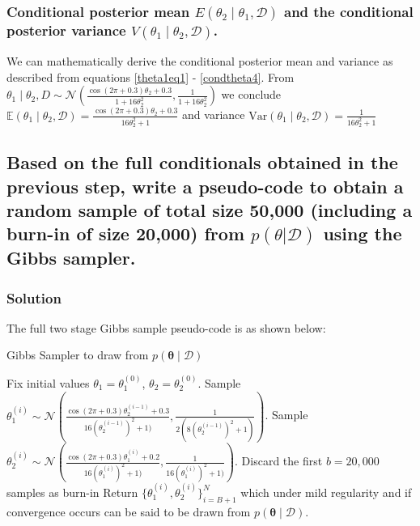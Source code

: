 \documentclass[12pt]{article}
\begin{document}
\subsubsection{Conditional posterior mean \(E(\theta_2 \mid \theta_1, \mathcal{D})\) and the conditional posterior variance \(V(\theta_1 \mid \theta_2, \mathcal{D})\).}

We can mathematically derive the conditional posterior mean and variance as described from equations \ref{theta1eq1} - \ref{condtheta4}.  From $\theta_1 \mid \theta_2, D \sim \mathcal{N} \left( \frac{\cos(2\pi+0.3)\theta_2 + 0.3}{1 + 16\theta_2^2}, \frac{1}{1 + 16\theta_2^2} \right)$ we conclude
$\mathbb{E}(\theta_1 \mid \theta_2, \mathcal{D}) = \frac{\cos(2\pi + 0.3)\theta_2 + 0.3}{16\theta_2^2 + 1}$ and variance  $  \mathrm{Var}(\theta_1 \mid \theta_2, \mathcal{D}) = \frac{1}{16\theta_2^2 + 1}$

\subsection{ Based on the full conditionals obtained in the previous step, write a pseudo-code to obtain a random sample of total size 50,000 (including a burn-in of size 20,000) from $p(\theta | \mathcal{D})$ using the Gibbs sampler.} 
\subsubsection{Solution}


The full two stage Gibbs sample pseudo-code is as shown below:
\begin{algorithm}
Gibbs Sampler to draw from \( p(\boldsymbol{\theta} \mid \mathcal{D}) \)
\begin{algorithmic}[1]

\State Fix initial values \( \theta_1 = \theta_1^{(0)} \), \( \theta_2 = \theta_2^{(0)} \).
    \State Sample \( \theta_1^{(i)} \sim \mathcal{N}\left(\frac{\cos(2\pi + 0.3)\theta_2^{(i-1)} + 0.3}{16(\theta_2^{(i-1)})^2 + 1)}, \frac{1}{2(8(\theta_2^{(i-1)})^2 + 1)}\right) \).
    \State Sample \( \theta_2^{(i)} \sim \mathcal{N}\left(\frac{\cos(2\pi + 0.3)\theta_1^{(i)} + 0.2}{16(\theta_1^{(i)})^2 + 1)}, \frac{1}{16(\theta_1^{(i)})^2 + 1)}\right) \).
\EndFor
\State Discard the first \( b = 20,000 \) samples as burn-in
\State Return \( \{\theta_1^{(i)}, \theta_2^{(i)}\}_{i=B+1}^{N} \) which under mild regularity and if convergence occurs can be said to be drawn from \( p(\boldsymbol{\theta} \mid \mathcal{D}) \).
\end{algorithmic}
\end{algorithm}
\end{document}
